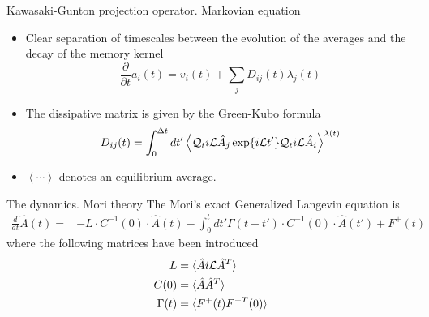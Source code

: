 \documentclass{beamer}
\newcommand{\esc}{\!\cdot\!}
\begin{document}
\begin{frame}{Kawasaki-Gunton projection operator. Markovian equation}
  \begin{itemize}
     \item Clear separation of timescales between the evolution of the averages and the decay of the memory kernel 
\begin{equation}
  \frac{\partial}{\partial t}a_i(t) = v_i(t) + \sum_j D_{ij}(t) \lambda_j(t)
\nonumber
\end{equation}
\item The  dissipative matrix  is  given  by  the Green-Kubo  formula
\begin{equation}
D_{ij}(t)=\int_0^{\Delta t} dt'\left\langle 
{\cal Q}_t i{\cal L}\hat{A}_j\exp\{i{\cal L}t'\}{\cal Q}_t i{\cal L}\hat{A}_i
\right\rangle^{\lambda(t)}
\label{dij}
\nonumber
\end{equation}
\item $\left\langle\cdots\right\rangle$ denotes an equilibrium average.
\end{itemize}
\end{frame}

\begin{frame}{The dynamics. Mori theory}
    The \alert{Mori's exact Generalized Langevin equation} \cite{Mori1965} is
\begin{align}
  \frac{d}{dt}\hat{A}(t)= & -L\esc C^{-1}(0)\esc \hat{A} (t) 
  -\int_0^tdt'\Gamma(t-t')\esc  C^{-1}(0)\esc \hat{A} (t') +F^+(t)
\nonumber
\end{align}
where the following matrices have been introduced
\begin{align}
  L&=\langle \hat{A}i{\cal L}\hat{A}^T\rangle \nonumber \\
  C(0)&=\langle \hat{A}\hat{A}^T\rangle \nonumber \\
\Gamma(t)&=\langle F^+(t)F^{+T}(0)\rangle
\nonumber
\end{align}
\end{frame}
\end{document}
